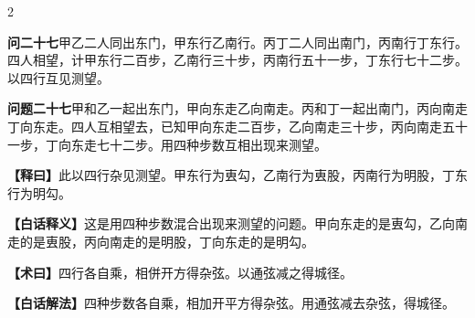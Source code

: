 \documentclass[11pt,a4paper]{article}
\newcommand{\WenQuestion}[1]{\textbf{\textcolor{classicalcolor}{#1}}}
\newcommand{\BaiQuestion}[1]{\textbf{\textcolor{moderncolor}{#1}}}
\newcommand{\WenExplain}{\textcolor{classicalcolor}{\textbf{【释曰】}}}
\newcommand{\BaiExplain}{\textcolor{moderncolor}{\textbf{【白话释义】}}}
\newcommand{\WenMethod}{\textcolor{classicalcolor}{\textbf{【术曰】}}}
\newcommand{\BaiMethod}{\textcolor{moderncolor}{\textbf{【白话解法】}}}
\begin{document}
\begin{paracol}{2}
\vspace{0.8em}

\switchcolumn*
\begin{tcolorbox}[colback=red!3,colframe=red!30!black,boxrule=0.3pt]
\WenQuestion{问二十七}\quad 甲乙二人同出东门，甲东行乙南行。丙丁二人同出南门，丙南行丁东行。四人相望，计甲东行二百步，乙南行三十步，丙南行五十一步，丁东行七十二步。以四行互见测望。
\end{tcolorbox}
\switchcolumn
\begin{tcolorbox}[colback=blue!3,colframe=blue!30!black,boxrule=0.3pt]
\BaiQuestion{问题二十七}\quad 甲和乙一起出东门，甲向东走乙向南走。丙和丁一起出南门，丙向南走丁向东走。四人互相望去，已知甲向东走二百步，乙向南走三十步，丙向南走五十一步，丁向东走七十二步。用四种步数互相出现来测望。
\end{tcolorbox}

\switchcolumn*
\begin{tcolorbox}[colback=red!5,colframe=red!30!black,boxrule=0.3pt]
\WenExplain\quad 此以四行杂见测望。甲东行为叀勾，乙南行为叀股，丙南行为明股，丁东行为明勾。
\end{tcolorbox}
\switchcolumn
\begin{tcolorbox}[colback=blue!5,colframe=blue!30!black,boxrule=0.3pt]
\BaiExplain\quad 这是用四种步数混合出现来测望的问题。甲向东走的是叀勾，乙向南走的是叀股，丙向南走的是明股，丁向东走的是明勾。
\end{tcolorbox}

\switchcolumn*
\begin{tcolorbox}[colback=red!5,colframe=red!40!black,boxrule=0.3pt]
\WenMethod\quad 四行各自乘，相併开方得杂弦。以通弦减之得城径。
\end{tcolorbox}
\switchcolumn
\begin{tcolorbox}[colback=blue!5,colframe=blue!40!black,boxrule=0.3pt]
\BaiMethod\quad 四种步数各自乘，相加开平方得杂弦。用通弦减去杂弦，得城径。
\end{tcolorbox}

\end{paracol}

\vspace{0.5em}
\end{document}
